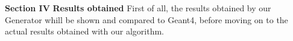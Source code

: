 \documentclass[8 pt]{beamer}
\begin{document}
%










\begin{frame}{}
\centering
	\huge{\textbf{\color{mycolor} Section IV}} \newline
	\LARGE{\textbf{\color{mycolor} Results obtained \color{black}}} \vfill
First of all, the results obtained by our Generator whill be shown and compared to Geant4, before moving on to the actual results obtained with our algorithm. \vfill
\end{frame}
\end{document}
